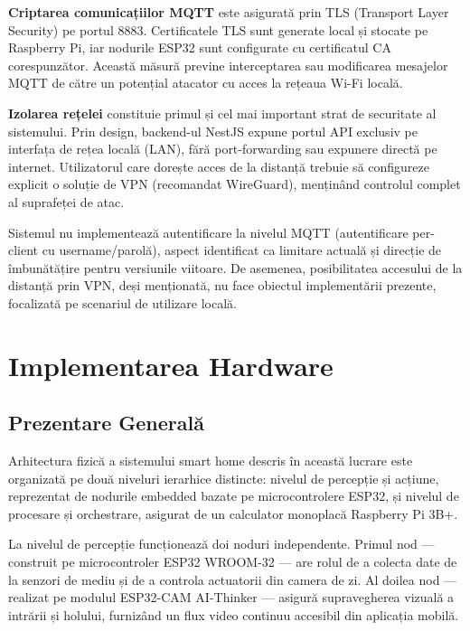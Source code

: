 \documentclass[12pt, twoside, a4paper]{report}
\begin{document}
\textbf{Criptarea comunicațiilor MQTT} este asigurată prin TLS (Transport Layer Security)
pe portul 8883. Certificatele TLS sunt generate local și stocate pe Raspberry Pi, iar
nodurile ESP32 sunt configurate cu certificatul CA corespunzător. Această măsură
previne interceptarea sau modificarea mesajelor MQTT de către un potențial atacator
cu acces la rețeaua Wi-Fi locală.

\textbf{Izolarea rețelei} constituie primul și cel mai important strat de securitate al
sistemului. Prin design, backend-ul NestJS expune portul API exclusiv pe interfața de
rețea locală (LAN), fără port-forwarding sau expunere directă pe internet. Utilizatorul
care dorește acces de la distanță trebuie să configureze explicit o soluție de VPN
(recomandat WireGuard), menținând controlul complet al suprafeței de atac.

Sistemul nu implementează autentificare la nivelul MQTT (autentificare per-client cu
username/parolă), aspect identificat ca limitare actuală și direcție de îmbunătățire
pentru versiunile viitoare. De asemenea, posibilitatea accesului de la distanță prin VPN,
deși menționată, nu face obiectul implementării prezente, focalizată pe scenariul de
utilizare locală.


\chapter{Implementarea Hardware}

\section{Prezentare Generală}

Arhitectura fizică a sistemului smart home descris în această lucrare este organizată
pe două niveluri ierarhice distincte: nivelul de percepție și acțiune, reprezentat de
nodurile embedded bazate pe microcontrolere ESP32, și nivelul de procesare și
orchestrare, asigurat de un calculator monoplacă Raspberry Pi 3B+.

La nivelul de percepție funcționează doi noduri independente. Primul nod --- construit
pe microcontroler ESP32 WROOM-32 --- are rolul de a colecta date de la senzori de mediu
și de a controla actuatorii din camera de zi. Al doilea nod --- realizat pe modulul
ESP32-CAM AI-Thinker --- asigură supravegherea vizuală a intrării și holului, furnizând
un flux video continuu accesibil din aplicația mobilă.
\end{document}
